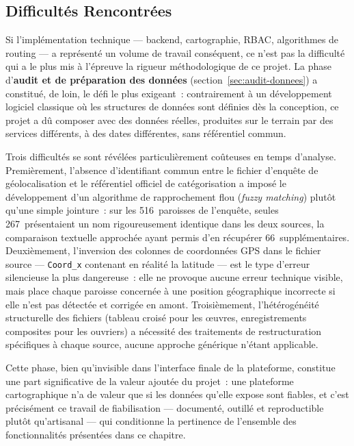 \documentclass[12pt, a4paper]{report}
\begin{document}
\subsection{Difficultés Rencontrées}
\label{ssec:disc-difficultes}

Si l'implémentation technique --- backend, cartographie, RBAC, algorithmes
de routing --- a représenté un volume de travail conséquent, ce n'est pas la
difficulté qui a le plus mis à l'épreuve la rigueur méthodologique de ce
projet. La phase d'\textbf{audit et de préparation des données}
(section~\ref{sec:audit-donnees}) a constitué, de loin, le défi le plus
exigeant~: contrairement à un développement logiciel classique où les
structures de données sont définies dès la conception, ce projet a dû
composer avec des données réelles, produites sur le terrain par des
services différents, à des dates différentes, sans référentiel commun.

Trois difficultés se sont révélées particulièrement coûteuses en temps
d'analyse. Premièrement, l'absence d'identifiant commun entre le fichier
d'enquête de géolocalisation et le référentiel officiel de catégorisation a
imposé le développement d'un algorithme de rapprochement flou
(\textit{fuzzy matching}) plutôt qu'une simple jointure~: sur les
516~paroisses de l'enquête, seules 267~présentaient un nom rigoureusement
identique dans les deux sources, la comparaison textuelle approchée ayant
permis d'en récupérer 66~supplémentaires. Deuxièmement, l'inversion des
colonnes de coordonnées GPS dans le fichier source --- \texttt{Coord\_x}
contenant en réalité la latitude --- est le type d'erreur silencieuse la
plus dangereuse~: elle ne provoque aucune erreur technique visible, mais
place chaque paroisse concernée à une position géographique incorrecte si
elle n'est pas détectée et corrigée en amont. Troisièmement, l'hétérogénéité
structurelle des fichiers (tableau croisé pour les œuvres, enregistrements
composites pour les ouvriers) a nécessité des traitements de restructuration
spécifiques à chaque source, aucune approche générique n'étant applicable.

Cette phase, bien qu'invisible dans l'interface finale de la plateforme,
constitue une part significative de la valeur ajoutée du projet~: une
plateforme cartographique n'a de valeur que si les données qu'elle expose
sont fiables, et c'est précisément ce travail de fiabilisation --- documenté,
outillé et reproductible plutôt qu'artisanal --- qui conditionne la
pertinence de l'ensemble des fonctionnalités présentées dans ce chapitre.
\end{document}
